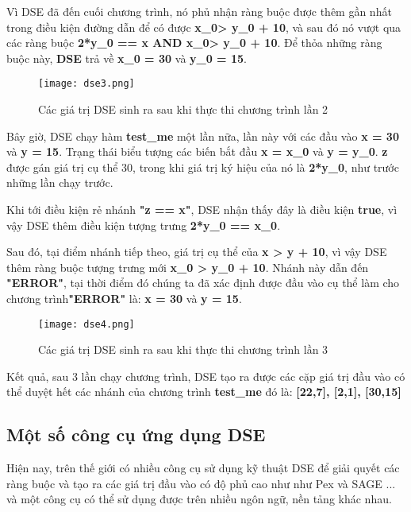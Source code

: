 Vì DSE đã đến cuối chương trình, nó phủ nhận ràng buộc được thêm gần nhất trong điều kiện đường dẫn để có được \textbf{x\_0> y\_0 + 10}, và sau đó nó vượt qua các ràng buộc \textbf{2*y\_0 == x AND x\_0> y\_0 + 10}. Để thỏa những ràng buộc này, \textbf{DSE} trả về \textbf{x\_0 = 30} và \textbf{y\_0 = 15}.

\begin{center}
	\begin{figure}[htp]
		\begin{center}
			\texttt{[image: dse3.png]}
		\end{center}
		\caption{Các giá trị DSE sinh ra sau khi thực thi chương trình lần 2}
		\label{refhinh1}
	\end{figure}
\end{center}

Bây giờ, DSE chạy hàm \textbf{test\_me} một lần nữa, lần này với các đầu vào \textbf{x = 30} và \textbf{y = 15}. Trạng thái biểu tượng các biến bắt đầu \textbf{x = x\_0} và \textbf{y = y\_0}. \textbf{z} được gán giá trị cụ thể 30, trong khi giá trị ký hiệu của nó là \textbf{2*y\_0}, như trước những lần chạy trước.

Khi tới điều kiện rẻ nhánh \textbf{"z == x"}, DSE nhận thấy đây là điều kiện \textbf{true}, vì vậy DSE thêm điều kiện tượng trưng \textbf{2*y\_0 == x\_0}.

Sau đó, tại điểm nhánh tiếp theo, giá trị cụ thể của \textbf{x > y + 10}, vì vậy DSE thêm ràng buộc tượng trưng mới \textbf{x\_0 > y\_0 + 10}. Nhánh này dẫn đến \textbf{"ERROR"}, tại thời điểm đó chúng ta đã xác định được đầu vào cụ thể làm cho chương trình\textbf{"ERROR"} là: \textbf{x = 30} và \textbf{y = 15}.

\begin{center}
	\begin{figure}[htp]
		\begin{center}
			\texttt{[image: dse4.png]}
		\end{center}
		\caption{Các giá trị DSE sinh ra sau khi thực thi chương trình lần 3}
		\label{refhinh1}
	\end{figure}
\end{center}

Kết quả, sau 3 lần chạy chương trình, DSE tạo ra được các cặp giá trị đầu vào có thể duyệt hết các nhánh của chương trình \textbf{test\_me} đó là: \textbf{[22,7], [2,1], [30,15]}
	
\subsection{Một số công cụ ứng dụng DSE}	
Hiện nay, trên thế giới có nhiều công cụ sử dụng kỹ thuật DSE để giải quyết các ràng buộc và tạo ra các giá trị đầu vào có độ phủ cao như như Pex \cite{tillmann2008pex} và SAGE \cite{godefroid2008automated}... và một công cụ có thể sử dụng được trên nhiều ngôn ngữ, nền tảng khác nhau.
		
